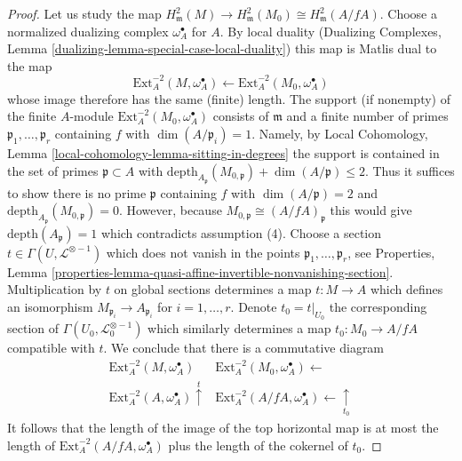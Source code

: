 \begin{proof}
\medskip\noindent
Let us study the map
$H^2_\mathfrak m(M) \to H^2_\mathfrak m(M_0) \cong H^2_\mathfrak m(A/fA)$.
Choose a normalized dualizing complex $\omega_A^\bullet$ for $A$.
By local duality
(Dualizing Complexes, Lemma \ref{dualizing-lemma-special-case-local-duality})
this map is Matlis dual to the map
$$
\text{Ext}^{-2}_A(M, \omega_A^\bullet)
\longleftarrow
\text{Ext}^{-2}_A(M_0, \omega_A^\bullet)
$$
whose image therefore has the same (finite) length.
The support (if nonempty) of the finite $A$-module
$\text{Ext}^{-2}_A(M_0, \omega_A^\bullet)$ consists of
$\mathfrak m$ and a finite number of primes
$\mathfrak p_1, \ldots, \mathfrak p_r$ containing $f$ with
$\dim(A/\mathfrak p_i) = 1$. Namely, by
Local Cohomology, Lemma \ref{local-cohomology-lemma-sitting-in-degrees}
the support is contained in the set of primes $\mathfrak p \subset A$ with
$\text{depth}_{A_\mathfrak p}(M_{0, \mathfrak p}) + \dim(A/\mathfrak p) \leq 2$.
Thus it suffices to show there is no prime $\mathfrak p$ containing $f$ with
$\dim(A/\mathfrak p) = 2$ and
$\text{depth}_{A_\mathfrak p}(M_{0, \mathfrak p}) = 0$.
However, because $M_{0, \mathfrak p} \cong (A/fA)_\mathfrak p$
this would give $\text{depth}(A_\mathfrak p) = 1$ which contradicts
assumption (4).
Choose a section $t \in \Gamma(U, \mathcal{L}^{\otimes -1})$
which does not vanish in the points $\mathfrak p_1, \ldots, \mathfrak p_r$, see
Properties, Lemma
\ref{properties-lemma-quasi-affine-invertible-nonvanishing-section}.
Multiplication by $t$ on global sections determines a map $t : M \to A$
which defines an isomorphism $M_{\mathfrak p_i} \to A_{\mathfrak p_i}$ for
$i = 1, \ldots, r$. Denote $t_0 = t|_{U_0}$ the corresponding section
of $\Gamma(U_0, \mathcal{L}_0^{\otimes -1})$ which similarly determines
a map $t_0 : M_0 \to A/fA$ compatible with $t$.
We conclude that there is a commutative diagram
$$
\begin{array}{cc}\text{Ext}^{-2}_A(M, \omega_A^\bullet) & \text{Ext}^{-2}_A(M_0, \omega_A^\bullet) \longleftarrow \\ \text{Ext}^{-2}_A(A, \omega_A^\bullet) \overset{t}{\uparrow} & \text{Ext}^{-2}_A(A/fA, \omega_A^\bullet) \longleftarrow\underset{t_0}{\uparrow}\end{array}
$$
It follows that the length of the image of the top horizontal
map is at most the length of $\text{Ext}^{-2}_A(A/fA, \omega_A^\bullet)$
plus the length of the cokernel of $t_0$.


\end{proof}
